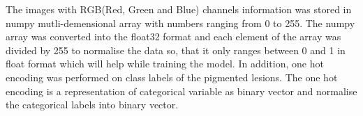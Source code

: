 The images with RGB(Red, Green and Blue) channels information was stored in numpy mutli-demensional array with numbers ranging from 0 to 255.
The numpy array was converted into the float32 format and each element of the array was divided by 255 to normalise the data so, that 
it only ranges between 0 and 1 in float format which will help while training the model. In addition, one hot encoding 
was performed on class labels of the pigmented lesions. The one hot encoding is a representation of categorical variable 
as binary vector and normalise the categorical labels into binary vector.